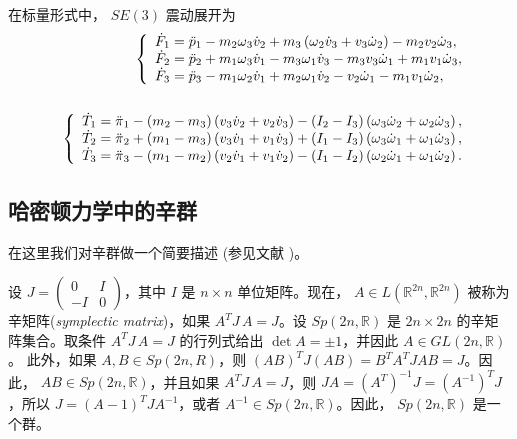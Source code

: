 \documentclass[11pt,fontset=founder]{ctexart}
\begin{document}
在标量形式中， $SE(3)$ 震动展开为
\begin{eqnarray*}
&&\left\{
\begin{array}{l}
\dot{F}_{{1}}=\ddot{p}_{1}-m_{{2}}\omega _{{3}}\dot{v}_{{2}}+m_{{3}}\left( {%
\omega }_{{2}}\dot{v}_{{3}}+v_{{3}}\dot{\omega}_{{2}}\right) -m_{{2}}v_{{2}}{%
\dot{\omega}}_{{3}}, \\
\dot{F}_{{2}}=\ddot{p}_{2}+m_{{1}}\omega _{{3}}\dot{v}_{{1}}-m_{{3}}\omega _{%
{1}}\dot{v}_{{3}}-m_{{3}}v_{{3}}\dot{\omega}_{{1}}+m_{{1}}v_{{1}}\dot{\omega}%
_{{3}}, \\
\dot{F}_{{3}}=\ddot{p}_{3}-m_{{1}}\omega _{{2}}\dot{v}_{{1}}+m_{{2}}\omega _{%
{1}}\dot{v}_{{2}}-v_{{2}}\dot{\omega}_{{1}}-m_{{1}}v_{{1}}\dot{\omega}_{{2}},%
\end{array}
\right. \\
&& \\
&&\left\{
\begin{array}{l}
\dot{T}_{{1}}=\ddot{\pi}_{1}-(m_{{2}}-m_{{3}})\left( v_{{3}}\dot{v}_{{2}}+v_{%
{2}}\dot{v}_{{3}}\right) -(I_{{2}}-I_{{3}})\left( \omega _{{3}}\dot{\omega}_{%
{2}}+{\omega }_{{2}}{\dot{\omega}}_{{3}}\right) , \\
\dot{T}_{{2}}=\ddot{\pi}_{2}+(m_{{1}}-m_{{3}})\left( v_{{3}}\dot{v}_{{1}}+v_{%
{1}}\dot{v}_{{3}}\right) +(I_{{1}}-I_{{3}})\left( {\omega }_{{3}}{\dot{\omega%
}}_{{1}}+{\omega }_{{1}}{\dot{\omega}}_{{3}}\right) , \\
\dot{T}_{{3}}=\ddot{\pi}_{3}-(m_{{1}}-m_{{2}})\left( v_{{2}}\dot{v}_{{1}}+v_{%
{1}}\dot{v}_{{2}}\right) -(I_{{1}}-I_{{2}})\left( {\omega }_{{2}}{\dot{\omega%
}}_{{1}}+{\omega }_{{1}}{\dot{\omega}}_{{2}}\right).%
\end{array}
\right.
\end{eqnarray*}

\subsection{哈密顿力学中的辛群}

\label{Sp}

在这里我们对辛群做一个简要描述 (参见文献 \cite%
{Marsden,GaneshSprBig,GaneshADG})。

设 $J=\left(
\begin{array}{cc}
0 & I \\
-I & 0%
\end{array}
\right)$，其中 $I$ 是 $n\times n$ 单位矩阵。现在， $A\in L(\mathbb{R}%
^{2n}, \mathbb{R}^{2n})$ 被称为辛矩阵(\emph{symplectic matrix})，如果 $A^{T}J%
\mathbf{\,}A=J$。设 $Sp(2n,\mathbb{R})$ 是 $2n\times 2n$
的辛矩阵集合。取条件 $A^{T}J\mathbf{\,}%
A=J$ 的行列式给出 $\det A=\pm 1$，并因此 $A\in GL(2n,\mathbb{R})$。 此外，如果 $%
A,B\in Sp(2n,R)$，则 $(AB)^{T}J(AB)=B^{T}A^{T}JAB=J$。因此， $AB\in Sp(2n,%
\mathbb{R})$，并且如果 $A^{T}J\mathbf{\,}A=J$，则 $%
JA=(A^{T})^{-1}J=(A^{-1})^{T}J$，所以 $J=\left( A-1\right) ^{T}JA^{-1}$，或者 $%
A^{-1}\in Sp(2n,\mathbb{R})$。因此， $Sp(2n,\mathbb{R}) $ 是一个群。
\end{document}
